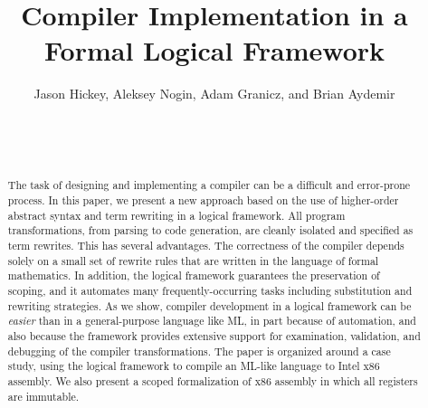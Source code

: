 \documentclass{sig-alternate}
\begin{document}
\title{Compiler Implementation in a Formal Logical Framework
}


\author{
\alignauthor Jason Hickey, Aleksey Nogin, Adam Granicz, and Brian Aydemir
\\
\\
\\
\\
}
\maketitle

\begin{abstract}
The task of designing and implementing a compiler can be a
difficult and error-prone process.  In this paper, we present a new
approach based on the use of higher-order abstract syntax and term
rewriting in a logical framework.  All program transformations, from
parsing to code generation, are cleanly isolated and specified as term
rewrites.  This has several advantages.  The correctness of the
compiler depends solely on a small set of rewrite rules that are
written in the language of formal mathematics.  In addition, the logical
framework guarantees the preservation of scoping, and it automates
many frequently-occurring tasks including substitution and rewriting
strategies.  As we show, compiler development in a logical framework
can be \emph{easier} than in a general-purpose language like ML, in
part because of automation, and also because the framework provides
extensive support for examination, validation, and debugging of the
compiler transformations.  The paper is organized around a case study,
using the \MetaPRL{} logical framework to compile an ML-like language to
Intel x86 assembly.  We also present a scoped formalization of x86
assembly in which all registers are immutable.

\end{abstract}

\sloppy
\renewcommand{\floatpagefraction}{0.9}






\printindex
\balancecolumns
\end{document}
